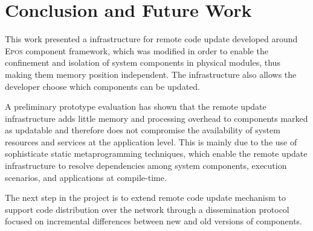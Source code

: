 \documentclass[10pt]{sigplanconf}
\newcommand{\epos}{\textsc{Epos}}
\begin{document}
\section{Conclusion and Future Work}

This work presented a infrastructure for remote code update developed
around \epos{} component framework, which was modified in order to
enable the confinement and isolation of system components in physical
modules, thus making them memory position independent. The infrastructure also
allows the developer choose which components can be updated.

A preliminary prototype evaluation has shown that the remote update
infrastructure adds little memory and processing overhead to
components marked as updatable and therefore does not compromise the availability of
system resources and services at the application level. This is mainly
due to the use of sophisticate static metaprogramming techniques,
which enable the remote update infrastructure to resolve dependencies
among system components, execution scenarios, and applications at
compile-time.

The next step in the project is to extend remote code update mechanism
to support code distribution over the network through a dissemination
protocol focused on incremental differences between new and old versions
of components.



\end{document}
